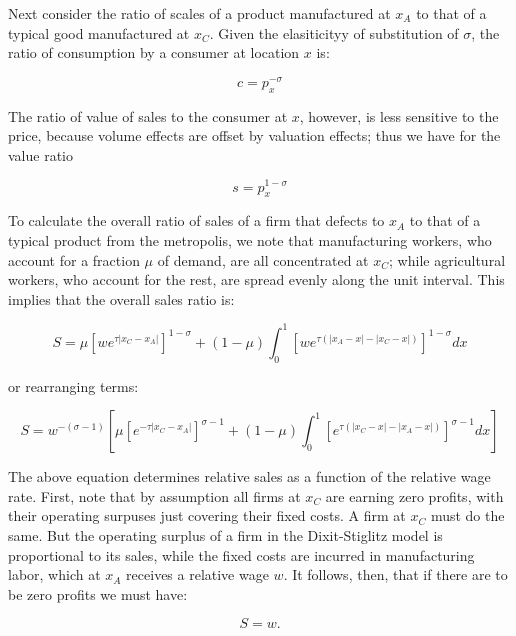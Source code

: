Next consider the ratio of scales of a product manufactured at $x_A$ to that of a typical good manufactured at $x_C$. Given the elasiticityy of substitution of $\sigma$, the ratio of consumption by a consumer at location $x$ is:

\begin{equation}
    c = p_x^{-\sigma}
\end{equation}

The ratio of value of sales to the consumer at $x$, however, is less sensitive to the price, because volume effects are offset by valuation effects; thus we have for the value ratio

\begin{equation}
    s = p_x^{1 - \sigma}
\end{equation}

To calculate the overall ratio of sales of a firm that defects to $x_A$ to that of a typical product from the metropolis, we note that manufacturing workers, who account for a fraction $\mu$ of demand, are all concentrated at $x_C$; while agricultural workers, who account for the rest, are spread evenly along the unit interval. This implies that the overall sales ratio is:

\begin{equation}
    S = \mu [we^{\tau |x_C - x_A|}]^{1 - \sigma} + (1 - \mu) \int_0^1 [we^{\tau(|x_A - x| - |x_C - x|)}]^{1 - \sigma} dx
\end{equation}
 
or rearranging terms:

\begin{equation}
    S = w^{-(\sigma - 1)}[\mu[e^{-\tau|x_C - x_A|}]^{\sigma - 1} + (1 - \mu)\int_0^1 [e^{\tau (|x_C - x| - |x_A - x|)}]^{\sigma - 1} dx]
\end{equation}

The above equation determines relative sales as a function of the relative wage rate. First, note that by assumption all firms at $x_C$ are earning zero profits, with their operating surpuses just covering their fixed costs. A firm at $x_C$ must do the same. But the operating surplus of a firm in the Dixit-Stiglitz model is proportional to its sales, while the fixed costs are incurred in manufacturing labor, which at $x_A$ receives a relative wage $w$. It follows, then, that if there are to be zero profits we must have:

\begin{equation}
    S = w.
\end{equation}

